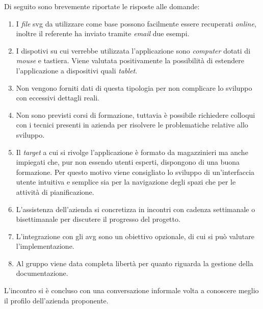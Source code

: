 \noindent
Di seguito sono brevemente riportate le risposte alle domande:
\begin{enumerate}
    \item I \textit{file} svg da utilizzare come base possono facilmente essere recuperati \textit{online}, inoltre il referente ha inviato tramite \textit{email} due esempi.
    \item I dispotivi su cui verrebbe utilizzata l'applicazione sono \textit{computer} dotati di \textit{mouse} e tastiera. Viene valutata positivamente la possibilità di estendere l'applicazione a dispositivi quali \textit{tablet}.
    \item Non vengono forniti dati di questa tipologia per non complicare lo sviluppo con eccessivi dettagli reali.
	\item Non sono previsti corsi di formazione, tuttavia è possibile richiedere colloqui con i tecnici presenti in azienda per risolvere le problematiche relative allo sviluppo.
	\item Il \textit{target} a cui si rivolge l'applicazione è formato da magazzinieri ma anche impiegati che, pur non essendo utenti esperti, dispongono di una buona formazione. Per questo motivo viene consigliato lo sviluppo di un'interfaccia utente intuitiva e semplice sia per la navigazione degli spazi che per le attività di pianificazione.
    \item L'assistenza dell'azienda si concretizza in incontri con cadenza settimanale o bisettimanale per discutere il progresso del progetto.
	\item L'integrazione con gli avg sono un obiettivo opzionale, di cui si può valutare l'implementazione.
    \item Al gruppo viene data completa libertà per quanto riguarda la gestione della documentazione. 
\end{enumerate}

\noindent
L'incontro si è concluso con una conversazione informale volta a conoscere meglio il profilo dell'azienda proponente.